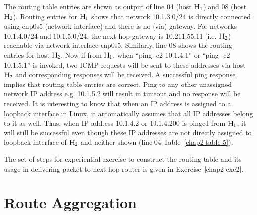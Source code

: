 \begin{multicols}{2}
The routing table entries are shown as output of line 04 (host ${\rm H}_{1}$) and 08 (host ${\rm H}_{2}$). Routing entries for ${\rm H}_{1}$ shows that network 10.1.3.0/24 is directly connected using enp0s5 (network interface) and there is no (via) gateway. For networks 10.1.4.0/24 and 10.1.5.0/24, the next hop gateway is 10.211.55.11 (i.e. ${\rm H}_{2}$) reachable via network interface enp0s5. Similarly, line 08 shows the routing entries for host ${\rm H}_{2}$. Now if from ${\rm H}_{1}$, when “ping -c2 10.1.4.1” or “ping -c2 10.1.5.1” is invoked, two ICMP requests will be sent to these addresses via host ${\rm H}_{2}$ and corresponding responses will be received. A successful ping response implies that routing table entries are correct. Ping to any other unassigned network IP address e.g. 10.1.5.2 will result in timeout and no response will be received. It is interesting to know that when an IP address is assigned to a loopback interface in Linux, it automatically assumes that all IP addresses belong to it as well. Thus, when IP address 10.1.4.2 or 10.1.4.200 is pinged from ${\rm H}_{1}$, it will still be successful even though these IP addresses are not directly assigned to loopback interface of ${\rm H}_{2}$ and neither shown (line 04 Table~\ref{chap2-table-5}).

The set of steps for experiential exercise to construct the routing table and its usage in delivering packet to next hop router is given in Exercise~\ref{chap2-exe2}.

\section{Route Aggregation}\label{chap2-sec5}


\end{multicols}
